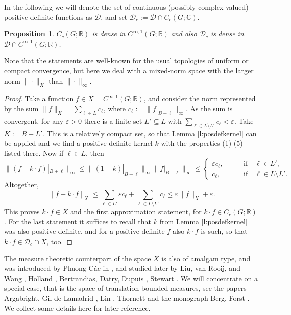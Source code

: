\documentclass[[a4paper,english,12pt]{amsart}
\theoremstyle{plain}
\newtheorem{proposition}[theorem]{Proposition}
\theoremstyle{remark}
\newcommand{\DD}{{\mathcal D}}
\newcommand{\Dc}{\mathcal{D}_c}
\newcommand{\ve}{\varepsilon}
\newcommand{\RR}{\mathbb R}
\newcommand{\CC}{\mathbb C}
\begin{document}
In the following we will denote the set of continuous (possibly complex-valued) positive definite functions as $\DD$, and set $\Dc:=\DD\cap C_c(G;\CC)$.

\begin{proposition}\label{prop:density} $C_c(G;\RR)$ is dense in $C^{\infty,1}(G;\RR)$ and also $\Dc$ is dense in $\DD\cap C^{\infty,1}(G;\RR)$.
\end{proposition}

Note that the statements are well-known for the usual topologies of uniform or compact convergence, but here we deal with a mixed-norm space with the larger norm $\| \cdot \|_X$ than  $\| \cdot \|_\infty$.
\begin{proof} Take a function $f\in X=C^{\infty,1}(G;\RR)$, and consider the norm represented by the sum  $\|f\|_X=\sum_{\ell \in L} c_\ell$, where $c_\ell:=\|f|_{B+\ell}\|_\infty$. As the sum is convergent, for any $\ve>0$ there is a finite set $L' \subseteq  L$ with $\sum_{\ell \in L\setminus L'} c_\ell <\ve$. Take $K:=B+L'$. This is a relatively compact set, so that Lemma \ref{l:posdefkernel} can be applied and we find a positive definite kernel $k$ with the properties (1)-(5) listed there. Now if $\ell \in L$, then
\[
\| (f - k\cdot f)|_{B+\ell} \|_\infty \le \|(1-k)|_{B+\ell}\|_\infty  \|f|_{B+\ell} \|_\infty \le
\begin{cases}  \ve c_\ell, \qquad & \text{if} \quad \ell \in L',
\\
c_\ell, \qquad & \text{if} \quad \ell \in L\setminus L'.
\end{cases}
\]
Altogether,
\[
\| f- k\cdot f\|_X \le \sum_{\ell \in L'} \ve c_\ell  + \sum_{\ell \in L\setminus L'} c_\ell \le \ve \|f\|_X +\ve.
\]
This proves $k \cdot f \in X$ and the first approximation statement, for $k \cdot f \in C_c(G;\RR)$. For the last statement it suffices to recall that $k$ from Lemma \ref{l:posdefkernel} was also positive definite, and for a positive definite $f$ also $k \cdot f$ is such, so that $k\cdot f \in \Dc \cap X$, too.
\end{proof}




The measure theoretic counterpart of the space $X$ is also of amalgam type, and was introduced by Phuong-C\'ac in \cite{Cac}, and studied later by  Liu, van Rooij, and Wang \cite{lrj},  Holland \cite{Holland1975, Holland75b},  Bertrandias, Datry, Dupuis \cite{BDD}, Stewart \cite{Stewart1979}.
We will concentrate on a special case, that is the space of translation bounded measures, see the papers  Argabright, Gil de Lamadrid \cite{AG-Memoirs}, Lin \cite{Lin}, Thornett \cite{Thornett} and the monograph Berg, Forst \cite{BergForst}.
We collect some details here for later reference.
\end{document}
